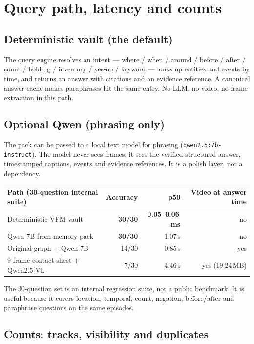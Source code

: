 \documentclass[10pt,a4paper]{article}
\newcommand{\code}[1]{\texttt{\small #1}}
\begin{document}
\section{Query path, latency and counts}

\subsection{Deterministic vault (the default)}

The query engine resolves an intent --- where / when / around / before / after / count / holding /
inventory / yes-no / keyword --- looks up entities and events by time, and returns an answer with
citations and an evidence reference. A canonical answer cache makes paraphrases hit the same entry.
No LLM, no video, no frame extraction in this path.

\subsection{Optional Qwen (phrasing only)}

The pack can be passed to a local text model for phrasing (\code{qwen2.5:7b-instruct}). The model
never sees frames; it sees the verified structured answer, timestamped captions, events and evidence
references. It is a polish layer, not a dependency.

\begin{center}
\small
\begin{tabularx}{\linewidth}{@{}L r r r@{}}
\toprule
\textbf{Path (30-question internal suite)} & \textbf{Accuracy} & \textbf{p50} & \textbf{Video at answer time} \\
\midrule
Deterministic VFM vault & \textbf{30/30} & \textbf{0.05--0.06\,ms} & no \\
Qwen 7B from memory pack & \textbf{30/30} & 1.07\,s & no \\
Original graph + Qwen 7B & 14/30 & 0.85\,s & yes \\
9-frame contact sheet + Qwen2.5-VL & 7/30 & 4.46\,s & yes (19.24\,MB) \\
\bottomrule
\end{tabularx}
\end{center}

\noindent
The 30-question set is an internal regression suite, not a public benchmark. It is useful because it
covers location, temporal, count, negation, before/after and paraphrase questions on the same
episodes.

\subsection{Counts: tracks, visibility and duplicates}
\end{document}
